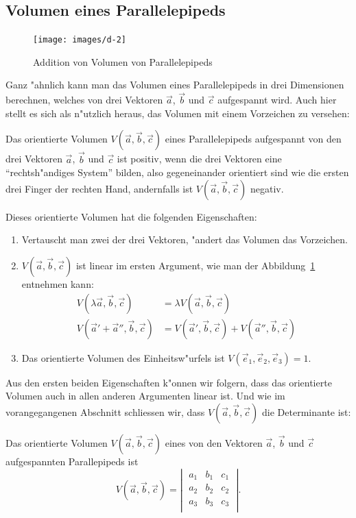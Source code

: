 \subsection{Volumen eines Parallelepipeds}
\begin{figure}
\begin{center}
\texttt{[image: images/d-2]}
\end{center}
\caption{Addition von Volumen von Parallelepipeds\label{image-volumina}}
\end{figure}
Ganz "ahnlich kann man das Volumen eines Parallelepipeds in drei Dimensionen
berechnen, welches von drei Vektoren $\vec a$, $\vec b$ und $\vec c$
aufgespannt wird. Auch hier stellt es sich als n"utzlich heraus, 
das Volumen mit einem Vorzeichen zu versehen:
\begin{definition}
Das orientierte Volumen 
$V(\vec a,\vec b,\vec c)$
eines Parallelepipeds aufgespannt von den drei
Vektoren
$\vec a$, $\vec b$ und $\vec c$ ist positiv, wenn die drei Vektoren
eine ``rechtsh"andiges System'' bilden, also gegeneinander orientiert
sind wie die ersten drei Finger der rechten Hand, andernfalls ist
$V(\vec a,\vec b,\vec c)$ negativ.
\end{definition}
Dieses orientierte Volumen hat die folgenden Eigenschaften:
\begin{enumerate}
\item Vertauscht man zwei der drei Vektoren, "andert das Volumen das Vorzeichen.
\item $V(\vec a,\vec b,\vec c)$ ist linear im ersten Argument, wie man 
der Abbildung~\ref{image-volumina} entnehmen kann:
\begin{align*}
V(\lambda\vec a,\vec b,\vec c)
&=
\lambda V(\vec a,\vec b,\vec c)
\\
V(\vec a'+\vec a'',\vec b,\vec c)
&=
V(\vec a',\vec b,\vec c)
+
V(\vec a'',\vec b,\vec c)
\end{align*}
\item Das orientierte Volumen des Einheitsw"urfels ist
$V(\vec e_1,\vec e_2,\vec e_3)=1$.
\end{enumerate}
Aus den ersten beiden Eigenschaften k"onnen wir folgern, dass das orientierte
Volumen auch in allen anderen Argumenten linear ist.
Und wie im vorangegangenen Abschnitt schliessen wir,
dass $V(\vec a,\vec b,\vec c)$ die Determinante ist:
\begin{satz}
Das orientierte Volumen $V(\vec a,\vec b,\vec c)$ eines von den Vektoren
$\vec a$, $\vec b$ und $\vec c$ aufgespannten Parallepipeds  ist
\[
V(\vec a,\vec b,\vec c)=\left|\;\begin{matrix}
a_1&b_1&c_1\\
a_2&b_2&c_2\\
a_3&b_3&c_3\\
\end{matrix}\;\right|.
\]
\end{satz}

